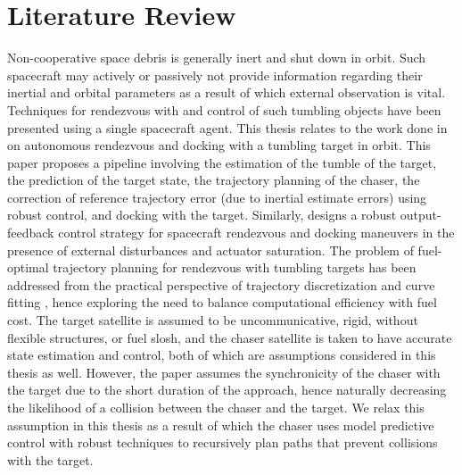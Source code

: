 \section{Literature Review}
Non-cooperative space debris is generally inert and shut down in orbit.
Such spacecraft may actively or passively not provide information regarding their inertial and orbital parameters as a result of which external observation is vital.
Techniques for rendezvous with and control of such tumbling objects have been presented using a single spacecraft agent.
This thesis relates to the work done in \cite{albee2021robust} on autonomous rendezvous and docking with a tumbling target in orbit.
This paper proposes a pipeline involving the estimation of the tumble of the target, the prediction of the target state, the trajectory planning of the chaser, the correction of reference trajectory error (due to inertial estimate errors) using robust control, and docking with the target.
Similarly, \cite{li2019extended} designs a robust output-feedback control strategy for spacecraft rendezvous and docking maneuvers in the presence of external disturbances and actuator saturation.
The problem of fuel-optimal trajectory planning for rendezvous with tumbling targets has been addressed from the practical perspective of trajectory discretization and curve fitting \cite{sternberg2018parameterization}, hence exploring the need to balance computational efficiency with fuel cost.
The target satellite is assumed to be uncommunicative, rigid, without flexible structures, or fuel slosh, and the chaser satellite is taken to have accurate state estimation and control, both of which are assumptions considered in this thesis as well.
However, the paper assumes the synchronicity of the chaser with the target due to the short duration of the approach, hence naturally decreasing the likelihood of a collision between the chaser and the target.
We relax this assumption in this thesis as a result of which the chaser uses model predictive control with robust techniques to recursively plan paths that prevent collisions with the target.

